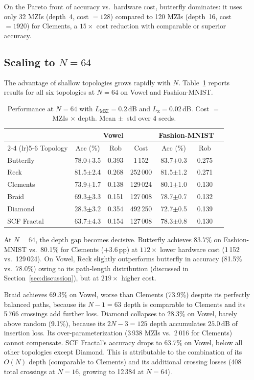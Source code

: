 \documentclass[11pt,a4paper]{article}
\begin{document}
On the Pareto front of accuracy vs.\ hardware cost, butterfly dominates: it uses
only 32 MZIs (depth~4, cost $= 128$) compared to 120 MZIs (depth~16, cost $= 1920$)
for Clements, a $15\times$ cost reduction with comparable or superior accuracy.


\subsection{Scaling to $N{=}64$}
\label{sec:n64}

The advantage of shallow topologies grows rapidly with $N$.
Table~\ref{tab:n64} reports results for all six topologies at $N{=}64$ on Vowel
and Fashion-MNIST.

\begin{table}[H]
\centering
\caption{Performance at $N{=}64$ with $L_{\mathrm{MZI}} = 0.2$\,dB and
$L_{\mathrm{x}} = 0.02$\,dB.  Cost $=$ MZIs $\times$ depth.
Mean $\pm$~std over 4 seeds.}
\label{tab:n64}
\begin{tabular}{lcccccc}
\toprule
 & \multicolumn{3}{c}{Vowel} & \multicolumn{2}{c}{Fashion-MNIST} \\
\cmidrule(lr){2-4} \cmidrule(lr){5-6}
Topology & Acc (\%) & Rob & Cost & Acc (\%) & Rob \\
\midrule
Butterfly    & 78.0$\pm$3.5 & 0.393 &     1\,152 & 83.7$\pm$0.3 & 0.275 \\
Reck         & 81.5$\pm$2.4 & 0.268 & 252\,000   & 81.5$\pm$1.2 & 0.271 \\
Clements     & 73.9$\pm$1.7 & 0.138 & 129\,024   & 80.1$\pm$1.0 & 0.130 \\
Braid        & 69.3$\pm$3.3 & 0.151 & 127\,008   & 78.7$\pm$0.7 & 0.132 \\
Diamond      & 28.3$\pm$3.2 & 0.354 & 492\,250   & 72.7$\pm$0.5 & 0.139 \\
SCF Fractal  & 63.7$\pm$4.3 & 0.154 & 127\,008   & 78.3$\pm$0.8 & 0.130 \\
\bottomrule
\end{tabular}
\end{table}

At $N{=}64$, the depth gap becomes decisive.  Butterfly achieves 83.7\% on
Fashion-MNIST vs.\ 80.1\% for Clements ($+3.6$\,pp) at $112\times$ lower hardware
cost (1\,152 vs.\ 129\,024).  On Vowel, Reck slightly outperforms butterfly in
accuracy (81.5\% vs.\ 78.0\%) owing to its path-length distribution (discussed in
Section~\ref{sec:discussion}), but at $219\times$ higher cost.

Braid achieves 69.3\% on Vowel, worse than Clements (73.9\%) despite its
perfectly balanced paths, because its $N{-}1 = 63$ depth is comparable to
Clements and its 5\,766 crossings add further loss.
Diamond collapses to 28.3\% on Vowel, barely above random (9.1\%), because
its $2N{-}3 = 125$ depth accumulates $25.0$\,dB of insertion loss.  Its
over-parameterization (3\,938 MZIs vs.\ 2\,016 for Clements) cannot compensate.
SCF Fractal's accuracy drops to 63.7\% on Vowel, below all other
topologies except Diamond.  This is attributable to the combination of its
$O(N)$ depth (comparable to Clements) and its additional crossing losses
(408 total crossings at $N{=}16$, growing to 12\,384 at $N{=}64$).
\end{document}
